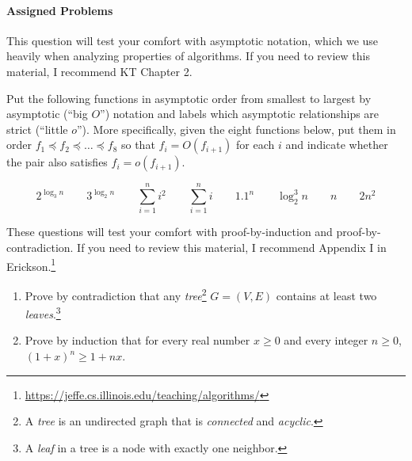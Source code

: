 \documentclass[11pt]{article}
\theoremstyle{definition}
\begin{document}
\paragraph{Assigned Problems}
\begin{enumerate}[leftmargin=0pt, itemsep=3ex]

    \problemitem This question will test your comfort with asymptotic notation, which we use heavily when analyzing properties of algorithms.  If you need to review this material, I recommend KT Chapter 2.
    
    Put the following functions in asymptotic order from smallest to largest by asymptotic (``big $O$'') notation and labels which asymptotic relationships are strict (``little $o$'').  More specifically, given the eight functions below, put them in order $f_1 \preceq f_2 \preceq \dots \preceq f_{8}$ so that $f_i = O(f_{i+1})$ for each $i$ and indicate whether the pair also satisfies $f_i = o(f_{i+1})$.
    
    \begin{equation*}
        2^{\log_3 n} \qquad 3^{\log_2 n} \qquad \sum_{i=1}^{n} i^2 \qquad \sum_{i=1}^{n} i \qquad 1.1^n \qquad \log_{2}^{3} n \qquad n \qquad 2n^2
    \end{equation*}
  
    \problemitem These questions will test your comfort with proof-by-induction and proof-by-contradiction.  If you need to review this material, I recommend Appendix I in Erickson.\footnote{\url{https://jeffe.cs.illinois.edu/teaching/algorithms/}}
    
    \begin{enumerate}[leftmargin=0pt, itemsep=3ex]
        \item Prove by contradiction that any \emph{tree}\footnote{A \emph{tree} is an undirected graph that is \emph{connected} and \emph{acyclic}.} $G = (V,E)$ contains at least two \emph{leaves}.\footnote{A \emph{leaf} in a tree is a node with exactly one neighbor.}
    
        \item Prove by induction that for every real number $x \geq 0$ and every integer $n \geq 0$, $(1+x)^n \geq 1+nx$.
        

\end{enumerate}
\end{enumerate}
\end{document}
